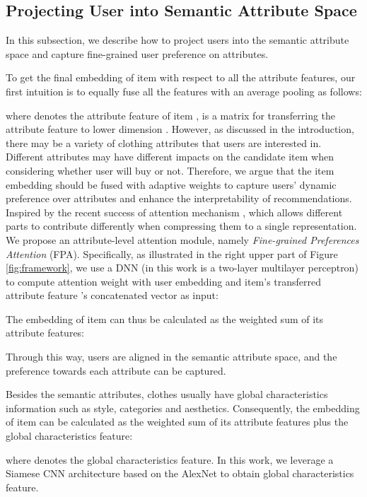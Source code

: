 \documentclass{article}
\begin{document}
\subsection{Projecting User into Semantic Attribute Space}
In this subsection, we describe how to project users into the semantic attribute space and capture fine-grained user preference on attributes.


To get the final embedding of item  with respect to all the attribute features, our first intuition is to equally fuse all the features with an average pooling as follows: 

where  denotes the  attribute feature of item ,  is a matrix for transferring the  attribute feature to lower dimension . However, as discussed in the introduction, there may be a variety of clothing attributes that users are interested in. Different attributes may have different impacts on the candidate item  when considering whether user  will buy  or not. Therefore, we argue that the item embedding should be fused with adaptive weights to capture users' dynamic preference over attributes and enhance the interpretability of recommendations. Inspired by the recent success of attention mechanism \cite{chen2018visually}, which allows different parts to contribute differently when compressing them to a single representation. We propose an attribute-level attention module, namely \textit{Fine-grained Preferences Attention} (FPA). Specifically, as illustrated in the right upper part of Figure \ref{fig:framework}, we use a DNN  (in this work is a two-layer multilayer perceptron) to compute attention weight  with user embedding  and item's  transferred attribute feature 's concatenated vector as input:


The embedding of item  can thus be calculated as the weighted sum of its attribute features:


Through this way, users are aligned in the semantic attribute space, and the preference towards each attribute can be captured.

Besides the semantic attributes, clothes usually have global characteristics information such as style,  categories and aesthetics. Consequently, 
the embedding of item  can be calculated as the weighted sum of its attribute features plus the global characteristics feature:

where  denotes the global characteristics feature. In this work, we leverage a Siamese CNN architecture based on the AlexNet \cite{krizhevsky2012imagenet} to obtain global characteristics feature.
\end{document}
